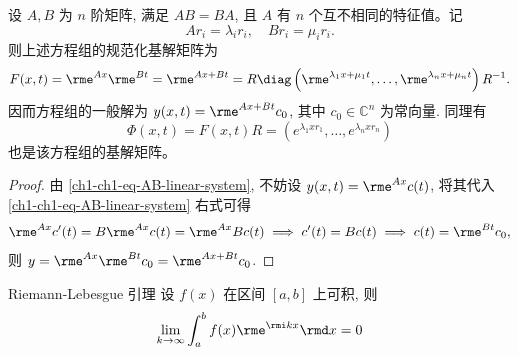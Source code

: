 \begin{corollary}
    设 $A, B$ 为 $n$ 阶矩阵, 满足 $AB=BA$, 且 $A$ 有 $n$ 个互不相同的特征值。记
    \begin{equation}
        A r_{i}=\lambda_{i} r_{i}, \quad B r_{i}=\mu_{i} r_{i}.
    \end{equation}
    则上述方程组的规范化基解矩阵为
    \begin{equation}
        F(x,t) = \rme^{Ax}\rme^{Bt} = \rme^{Ax+Bt} = R\diag\left( \rme^{\lambda_{1} x + \mu_{1} t}, \ldots, \rme^{\lambda_{n} x + \mu_{n} t} \right) R^{-1}.
    \end{equation}
    因而方程组的一般解为 $y(x,t) = \rme^{Ax+Bt}c_0$, 其中 $c_0\in\mathbb{C}^n$ 为常向量. 同理有
    \begin{equation}
        \Phi(x,t) = F(x,t) R = \left( e^{\lambda_{1} x r_{1}}, \ldots, e^{\lambda_{n} x r_{n}} \right)
    \end{equation}
    也是该方程组的基解矩阵。
\end{corollary}
\begin{proof}
    由 \eqref{ch1-ch1-eq-AB-linear-system}, 不妨设 $y(x,t)=\rme^{A x} c(t)$, 将其代入 \eqref{ch1-ch1-eq-AB-linear-system} 右式可得
    \begin{equation}
        \rme^{A x} c'(t) = B \rme^{A x}c(t) = \rme^{A x} B c(t) \implies c'(t)=B c(t) \implies c(t)=\rme^{Bt}c_{0},
    \end{equation}
    则 $y = \rme^{A x} \rme^{B t} c_{0} = \rme^{A x + B t} c_{0}$.
\end{proof}
\begin{lemma}{Riemann-Lebesgue 引理}
    设 $f(x)$ 在区间 $[a,b]$ 上可积, 则
    \begin{equation}
        \lim_{k \to \infty} \int_{a}^{b} f(x) \rme^{\rmi k x} \rmd x = 0
    \end{equation}
\end{lemma}
